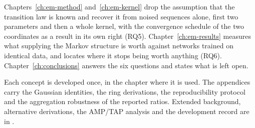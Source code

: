 Chapters~\ref{ch:em-method} and~\ref{ch:em-kernel} drop the assumption that the
transition law is known and recover it from noised sequences alone, first two
parameters and then a whole kernel, with the convergence schedule of the two
coordinates as a result in its own right (RQ5). Chapter~\ref{ch:em-results}
measures what supplying the Markov structure is worth against networks trained
on identical data, and locates where it stops being worth anything (RQ6).
Chapter~\ref{ch:conclusions} answers the six questions and states what is left
open.

Each concept is developed once, in the chapter where it is used. The
appendices carry the Gaussian identities, the ring derivations, the
reproducibility protocol and the aggregation robustness of the reported ratios.
Extended background, alternative derivations, the AMP/TAP analysis and the
development record are in \compendium{}.
